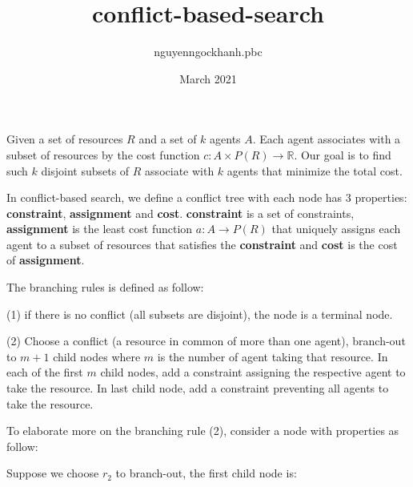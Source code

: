 \documentclass{article}
\title{conflict-based-search}
\author{nguyenngockhanh.pbc }
\date{March 2021}
\begin{document}
    \maketitle

    Given a set of resources $R$ and a set of  $k$ agents $A$. Each agent associates with a subset of resources by the cost function $c: A \times P(R) \to \mathbb{R}$. Our goal is to find such $k$ disjoint subsets of $R$ associate with $k$ agents that minimize the total cost.

    In conflict-based search, we define a conflict tree with each node has 3 properties: \textbf{constraint}, \textbf{assignment} and \textbf{cost}. \textbf{constraint} is a set of constraints, \textbf{assignment} is the least cost function $a: A \to P(R)$ that uniquely assigns each agent to a subset of resources that satisfies the \textbf{constraint} and \textbf{cost} is the cost of \textbf{assignment}.

    The branching rules is defined as follow:

    (1) if there is no conflict (all subsets are disjoint), the node is a terminal node.

    (2) Choose a conflict (a resource in common of more than one agent), branch-out to $m+1$ child nodes where $m$ is the number of agent taking that resource. In each of the first $m$ child nodes, add a constraint assigning the respective agent to take the resource. In last child node, add a constraint preventing all agents to take the resource.

    To elaborate more on the branching rule (2), consider a node with properties as follow:



    Suppose we choose $r_2$ to branch-out, the first child node is:

\end{document}
